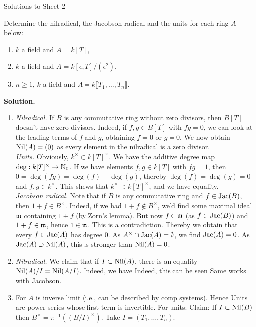\documentclass[a4paper,11pt]{article}
\begin{document}
\begin{center}
    \huge{Solutions to Sheet 2}
\end{center}

Determine the nilradical, the Jacobson radical and the units for each
ring $A$ below:
\begin{enumerate}
    \item $k$ a field and $A = k[T]$,
    \item $k$ a field and $A = k[\epsilon, T]/(\epsilon^2)$,
    \item $n \geq 1$, $k$ a field and $A = k \llbracket T_1, \dots, T_n \rrbracket$. 
\end{enumerate}
\textbf{Solution.}
\begin{enumerate}
    \item \textit{Nilradical.} If $B$ is any commutative ring without
        zero divisors, then $B[T]$ doesn't have zero divisors. Indeed,
        if $f, g \in B[T]$ with $fg = 0$, we can look at the leading terms
        of $f$ and $g$, obtaining $f = 0$ or $g = 0$. We now obtain $\operatorname{Nil}(A) = (0)$
        as every element in the nilradical is a zero divisor. \\
        \textit{Units.} Obviously, $k^\times \subset k[T]^\times$.
        We have the additive degree map $\deg: k[T]^\times \to \mathbb{N}_0$. If
        we have elements $f,g \in k[T]$ with $fg = 1$,
        then $0 = \deg (fg) = \deg(f) + \deg(g)$, thereby $\deg(f) = \deg(g) = 0$
        and $f,g \in k^\times$. This shows that $k^\times \supset k[T]^\times$,
        and we have equality. \\
        \textit{Jacobson radical.} Note that if $B$ is any commutative 
        ring and $f \in \operatorname{Jac}(B)$, then $1 + f \in B^\times$. Indeed, if we had
        $1 + f \not \in B^\times$, we'd find some maximal ideal $\mathfrak{m}$ containing
        $1 + f$ (by Zorn's lemma). But now $f \in \mathfrak{m}$ (as $f \in \operatorname{Jac}(B)$)
        and $1 + f \in \mathfrak{m}$, hence $1 \in \mathfrak{m}$. This is a contradiction. 
        Thereby we obtain
        that every $f \in \operatorname{Jac}(A)$ has degree $0$. As $A^\times \cap \operatorname{Jac}(A) =
        \emptyset$, we find $\operatorname{Jac}(A) = 0$. As $\operatorname{Jac}(A) \supset \operatorname{Nil}(A)$, this
        is stronger than $\operatorname{Nil}(A) = 0$. 
    \item \textit{Nilradical.} We claim that if $I \subset \operatorname{Nil}(A)$, there is
        an equality $\operatorname{Nil}(A)/I = \operatorname{Nil}(A/I)$. Indeed, we have 
        Indeed, this can be seen Same works with Jacobson.
    \item For $A$ is inverse limit (i.e., can be described by comp systems). Hence Units are power series whose first term is invertible. 
        For units: Claim: If $I \subset \operatorname{Nil}(B)$ then $B^\times = \pi^{-1} ((B/I)^\times)$. Take $I = (T_1, \dots, T_n)$. 
\end{enumerate}
    
\end{document}

